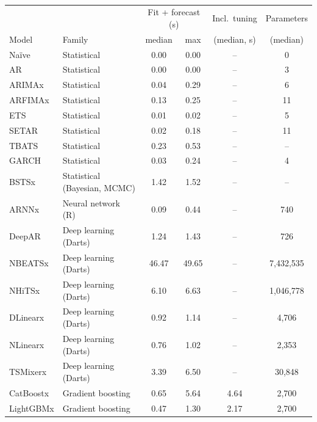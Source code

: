 \begin{table}[!htbp]
\fontsize{7}{8}\selectfont
\caption{}
\centering
\begin{tabular}{llcccc}
\hline
 & & \multicolumn{2}{c}{Fit + forecast (s)} & Incl.\ tuning & Parameters \\
Model & Family & median & max & (median, s) & (median) \\ \hline
Naïve & Statistical & 0.00 & 0.00 & -- & 0 \\
AR & Statistical & 0.00 & 0.00 & -- & 3 \\
ARIMAx & Statistical & 0.04 & 0.29 & -- & 6 \\
ARFIMAx & Statistical & 0.13 & 0.25 & -- & 11 \\
ETS & Statistical & 0.01 & 0.02 & -- & 5 \\
SETAR & Statistical & 0.02 & 0.18 & -- & 11 \\
TBATS & Statistical & 0.23 & 0.53 & -- & -- \\
GARCH & Statistical & 0.03 & 0.24 & -- & 4 \\
BSTSx & Statistical (Bayesian, MCMC) & 1.42 & 1.52 & -- & -- \\
ARNNx & Neural network (R) & 0.09 & 0.44 & -- & 740 \\
DeepAR & Deep learning (Darts) & 1.24 & 1.43 & -- & 726 \\
NBEATSx & Deep learning (Darts) & 46.47 & 49.65 & -- & 7,432,535 \\
NHiTSx & Deep learning (Darts) & 6.10 & 6.63 & -- & 1,046,778 \\
DLinearx & Deep learning (Darts) & 0.92 & 1.14 & -- & 4,706 \\
NLinearx & Deep learning (Darts) & 0.76 & 1.02 & -- & 2,353 \\
TSMixerx & Deep learning (Darts) & 3.39 & 6.50 & -- & 30,848 \\
{\color{blue}CatBoostx} & Gradient boosting & 0.65 & 5.64 & 4.64 & 2,700 \\
{\color{blue}LightGBMx} & Gradient boosting & 0.47 & 1.30 & 2.17 & 2,700 \\

\end{tabular}
\end{table}
